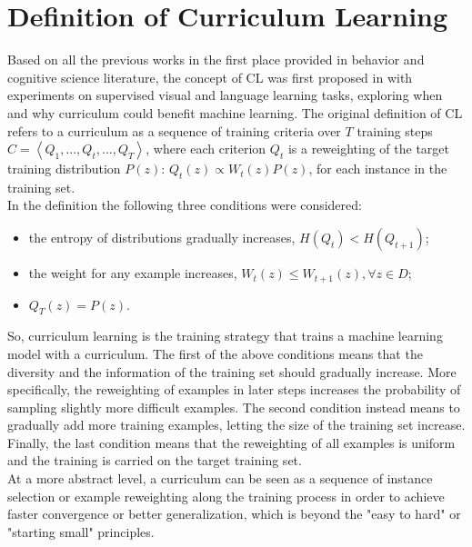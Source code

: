 \section{Definition of Curriculum Learning}
Based on all the previous works in the first place provided in behavior and 
cognitive science literature, the concept of CL was first proposed in \cite{bengio2009curriculum} with 
experiments on supervised visual and language learning tasks, exploring when and why curriculum could benefit machine learning.
The original definition of CL refers to a curriculum as a sequence of training criteria 
over \(T\) training steps \( C = \left \langle Q_1, ..., Q_t, ..., Q_T \right \rangle\), where each  
criterion \(Q_t\) is a reweighting of the target training distribution \(P(z)\): \(Q_t(z) \propto W_t(z)P(z)\), for 
each instance in the training set.\\ In the definition the following three conditions were considered:
\begin{itemize}
    \item the entropy of distributions gradually increases, \(H(Q_t) < H(Q_{t+1})\);
    \item the weight for any example increases, \(W_t(z) \leq W_{t+1}(z),  \forall z \in D\);
    \item \(Q_T(z) = P(z)\).
\end{itemize}
So, curriculum learning is the training strategy that trains a machine learning model
with a curriculum. The first of the above conditions means that the diversity 
and the information of the training set should gradually increase. More specifically,
the reweighting of examples in later steps increases the probability of sampling slightly more difficult examples.
The second condition instead means to gradually add more training examples, letting the size of the training set increase. 
Finally, the last condition
means that the reweighting of all examples is uniform and the training is carried on the target training set.\\
At a more abstract level, a curriculum can be seen as a sequence of instance selection or example reweighting along the training process in order to achieve faster convergence or better generalization, 
which is beyond the "easy to hard" or "starting small" principles. 

